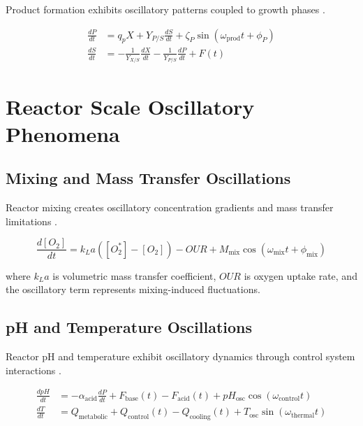 \documentclass[twocolumn]{article}
\begin{document}
Product formation exhibits oscillatory patterns coupled to growth phases \citep{lee2015fundamentals}.

\begin{align}
\frac{dP}{dt} &= q_p X + Y_{P/S} \frac{dS}{dt} + \zeta_P \sin(\omega_{\text{prod}}t + \phi_P) \label{eq:product_formation} \\
\frac{dS}{dt} &= -\frac{1}{Y_{X/S}} \frac{dX}{dt} - \frac{1}{Y_{P/S}} \frac{dP}{dt} + F(t) \label{eq:substrate_consumption}
\end{align}

\section{Reactor Scale Oscillatory Phenomena}

\subsection{Mixing and Mass Transfer Oscillations}

Reactor mixing creates oscillatory concentration gradients and mass transfer limitations \citep{enfors2001physiological,bylund2000substrate}.

\begin{equation}
\frac{d[O_2]}{dt} = k_L a ([O_2^*] - [O_2]) - OUR + M_{\text{mix}} \cos(\omega_{\text{mix}}t + \phi_{\text{mix}})
\label{eq:oxygen_transfer}
\end{equation}

where $k_L a$ is volumetric mass transfer coefficient, $OUR$ is oxygen uptake rate, and the oscillatory term represents mixing-induced fluctuations.

\subsection{pH and Temperature Oscillations}

Reactor pH and temperature exhibit oscillatory dynamics through control system interactions \citep{mandenius2016bioprocess}.

\begin{align}
\frac{dpH}{dt} &= -\alpha_{\text{acid}} \frac{dP}{dt} + F_{\text{base}}(t) - F_{\text{acid}}(t) + pH_{\text{osc}} \cos(\omega_{\text{control}}t) \label{eq:ph_dynamics} \\
\frac{dT}{dt} &= Q_{\text{metabolic}} + Q_{\text{control}}(t) - Q_{\text{cooling}}(t) + T_{\text{osc}} \sin(\omega_{\text{thermal}}t) \label{eq:temperature_dynamics}
\end{align}
\end{document}
